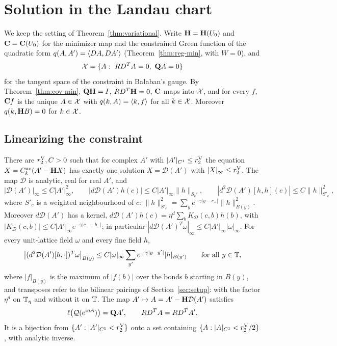 \section{Solution in the Landau chart}\label{sec:var-solution}

We keep the setting of Theorem~\ref{thm:variational}. Write $\mathbf H=\mathbf H(U_0)$ and $\mathbf C=\mathbf C(U_0)$ for the minimizer map and the constrained Green function of the quadratic form $q(A,A')=\langle D A,D A'\rangle$ (Theorem~\ref{thm:reg-min}, with $W=0$), and
\[
\mathcal X=\{A:\ RD^TA=0,\ \mathbf Q A=0\}
\]
for the tangent space of the constraint in Ba\l aban's gauge. By Theorem~\ref{thm:cov-min}, $\mathbf Q\mathbf H=I$, $RD^T\mathbf H=0$, $\mathbf C$ maps into $\mathcal X$, and for every $f$, $\mathbf C f$ is the unique $A\in\mathcal X$ with $q(k,A)=\langle k,f\rangle$ for all $k\in\mathcal X$. Moreover $q(k,\mathbf H B)=0$ for $k\in\mathcal X$.

\subsection{Linearizing the constraint}\label{ss:26.1}

\begin{lemma}\label{lem:linearizing}
There are $r_2^{\rm V},C>0$ such that for complex $A'$ with $|A'|_{C^1}\le r_2^{\rm V}$ the equation $X=C^{\rm av}_k(A'-\mathbf H X)$ has exactly one solution $X=\mathcal D(A')$ with $|X|_\infty\le r_2^{\rm V}$. The map $\mathcal D$ is analytic, real for real $A'$, and
\[
|\mathcal D(A')|_\infty\le C|A'|_\infty^2,\qquad|d\mathcal D(A')h(c)|\le C|A'|_\infty\|h\|_{S_c'},\qquad|d^2\mathcal D(A')[h,h](c)|\le C\|h\|^2_{S'_c},
\]
where $S'_c$ is a weighted neighbourhood of $c$: $\|h\|^2_{S'_c}=\sum_{y}e^{-\gamma|y-c_-|}\|h\|^2_{B(y)}$. Moreover $d\mathcal D(A')$ has a kernel, $d\mathcal D(A')h(c)=\eta^d\sum_bK_{\mathcal D}(c,b)h(b)$, with $|K_{\mathcal D}(c,b)|\le C|A'|_\infty e^{-\gamma|c_--b_-|}$; in particular $|d\mathcal D(A')^T\omega|_\infty\le C|A'|_\infty|\omega|_\infty$. For every unit-lattice field $\omega$ and every fine field $h$,
\begin{equation}\label{eq:d2D-mixed}
\big|(d^2\mathcal D(A')[h,\cdot])^T\omega\big|_{B(y)}\le C|\omega|_\infty\sum_{y'}e^{-\gamma|y-y'|}|h|_{B(y')}\qquad\text{for all }y\in\mathbb T,
\end{equation}
where $|f|_{B(y)}$ is the maximum of $|f(b)|$ over the bonds $b$ starting in $B(y)$, and transposes refer to the bilinear pairings of Section~\ref{sec:setup}: with the factor $\eta^d$ on $\mathbb T_\eta$ and without it on $\mathbb T$. The map $A'\mapsto A=A'-\mathbf H\mathcal D(A')$ satisfies
\[
\ell\big(\mathcal Q(e^{\mathrm i\eta A})\big)=\mathbf Q A',\qquad RD^TA=RD^TA'.
\]
It is a bijection from $\{A':|A'|_{C^1}<r_2^{\rm V}\}$ onto a set containing $\{A:|A|_{C^1}<r_2^{\rm V}/2\}$, with analytic inverse.
\end{lemma}

